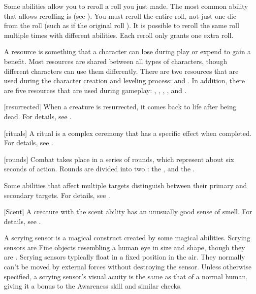  Some abilities allow you to reroll a roll you just made.
The most common ability that allows rerolling is  (see ).
You must reroll the entire roll, not just one die from the roll (such as if the original roll ).
It is possible to reroll the same roll multiple times with different abilities.
Each reroll only grants one extra roll.

 A resource is something that a character can lose during play or expend to gain a benefit.
Most resources are shared between all types of characters, though different characters can use them differently.
There are two resources that are used during the character creation and leveling process:  and .
In addition, there are five resources that are used during gameplay: , , , , and .

[resurrected] When a creature is resurrected, it comes back to life after being dead.
For details, see .

[rituals] A ritual is a complex \magical ceremony that has a specific effect when completed.
For details, see .

[rounds] Combat takes place in a series of rounds, which represent about six seconds of action.
Rounds are divided into two : the , and the .

 Some abilities that affect multiple targets distinguish between their primary and secondary targets.
For details, see .

[Scent] A creature with the scent ability has an unusually good sense of smell.
For details, see .

 A scrying sensor is a magical construct created by some magical abilities.
Scrying sensors are Fine objects resembling a human eye in size and shape, though they are .
Scrying sensors typically float in a fixed position in the air.
They normally can't be moved by external forces without destroying the sensor.
Unless otherwise specified, a scrying sensor's visual acuity is the same as that of a normal human, giving it a  bonus to the Awareness skill and similar checks.

